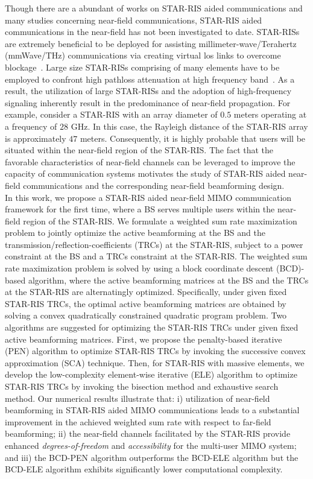 \documentclass[12pt, draftclsnofoot, onecolumn]{IEEEtran}
\newcommand{\los}{\gls{los}\xspace}
\begin{document}
\indent Though there are a abundant of works on STAR-RIS aided communications and many studies concerning near-field communications, STAR-RIS aided communications in the near-field has not been investigated to date. STAR-RISs are extremely beneficial to be deployed for assisting millimeter-wave/Terahertz (mmWave/THz) communications via creating virtual \los links to overcome blockage~\cite{6995424}. Large size STAR-RISs comprising of many elements have to be employed to confront high pathloss attenuation at high frequency band~\cite{8901159}. As a result, the utilization of large STAR-RISs and the adoption of high-frequency signaling inherently result in the predominance of near-field propagation. For example, consider a STAR-RIS with an array diameter of $0.5$ meters operating at a frequency of $28$ GHz. In this case, the Rayleigh distance of the STAR-RIS array is approximately $47$ meters. Consequently, it is highly probable that users will be situated within the near-field region of the STAR-RIS. The fact that the favorable characteristics of near-field channels can be leveraged to improve the capacity of communication systems motivates the study of STAR-RIS aided near-field communications and the corresponding near-field beamforming design.\\
\indent In this work, we propose a STAR-RIS aided near-field MIMO communication framework for the first time, where a BS serves multiple users within the near-field region of the STAR-RIS. We formulate a weighted sum rate maximization problem to jointly optimize the active beamforming at the BS and the transmission/reflection-coefficients (TRCs) at the STAR-RIS, subject to a power constraint at the BS and a TRCs constraint at the STAR-RIS. The weighted sum rate maximization problem is solved by using a block coordinate descent (BCD)-based algorithm, where the active beamforming matrices at the BS and the TRCs at the STAR-RIS are alternatingly optimized. Specifically, under given fixed STAR-RIS TRCs, the optimal active beamforming matrices are obtained by solving a convex quadratically constrained quadratic program problem. Two algorithms are suggested for optimizing the STAR-RIS TRCs under given fixed active beamforming matrices. First, we propose the penalty-based iterative (PEN) algorithm to optimize STAR-RIS TRCs by invoking the successive convex approximation (SCA) technique. Then, for STAR-RIS with massive elements, we develop the low-complexity element-wise iterative (ELE) algorithm to optimize STAR-RIS TRCs by invoking the bisection method and  exhaustive search method. Our numerical results illustrate that: i) utilization of near-field beamforming in STAR-RIS aided MIMO communications leads to a substantial improvement in the achieved weighted sum rate with respect to far-field beamforming; ii) the near-field channels facilitated by the STAR-RIS provide enhanced \emph{degrees-of-freedom} and \emph{accessibility} for the multi-user MIMO system; and iii) the BCD-PEN algorithm outperforms the BCD-ELE algorithm but the BCD-ELE algorithm exhibits significantly lower computational complexity.\\
\end{document}
